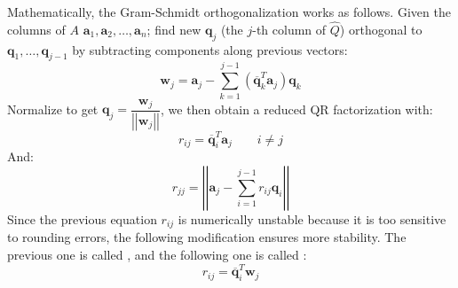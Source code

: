 \highspace
Mathematically, the Gram-Schmidt orthogonalization works as follows. Given the columns of $A$ $\mathbf{a}_{1}, \mathbf{a}_{2}, \dots, \mathbf{a}_{n}$; find new $\mathbf{q}_{j}$ (the $j$-th column of $\widehat{Q}$) orthogonal to $\mathbf{q}_{1}, \dots, \mathbf{q}_{j-1}$ by subtracting components along previous vectors:
\begin{equation*}
    \mathbf{w}_{j} = \mathbf{a}_{j} - \displaystyle\sum_{k=1}^{j-1} \left(\overline{\mathbf{q}}_{k}^{T}\mathbf{a}_{j}\right)\mathbf{q}_{k}
\end{equation*}
Normalize to get $\mathbf{q}_{j} = \dfrac{\mathbf{w}_{j}}{\left|\left|\mathbf{w}_{j}\right|\right|}$, we then obtain a reduced QR factorization with:
\begin{equation}
    r_{ij} = \overline{\mathbf{q}}_{i}^{T}\mathbf{a}_{j} \hspace{2em} i \ne j
\end{equation}
And:
\begin{equation*}
    r_{jj} = \left|\left|\mathbf{a}_{j} - \displaystyle\sum_{i=1}^{j-1} r_{ij}\mathbf{q}_{i}\right|\right|
\end{equation*}
Since the previous equation $r_{ij}$ is numerically unstable because it is too sensitive to rounding errors, the following modification ensures more stability. The previous one is called , and the following one is called :
\begin{equation}
    r_{ij} = \overline{\mathbf{q}}_{i}^{T}\mathbf{w}_{j}
\end{equation}